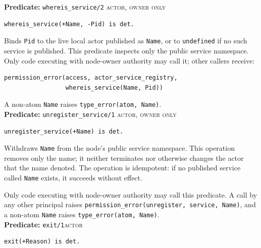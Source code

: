 \noindent \textbf{Predicate:} \texttt{whereis\_\allowbreak{}service/\allowbreak{}2}
\hfill\textsc{actor, owner only}

\begin{verbatim}
whereis_service(+Name, -Pid) is det.
\end{verbatim}

\noindent Binds \texttt{Pid} to the live local actor published as
\texttt{Name}, or to \texttt{undefined} if no such service is published.
This predicate inspects only the public service namespace. Only code executing
with node-owner authority may call it; other callers receive:
\begin{verbatim}
permission_error(access, actor_service_registry,
                 whereis_service(Name, Pid))
\end{verbatim}
A non-atom \texttt{Name} raises
\texttt{type\_\allowbreak{}error(\allowbreak{}atom,\allowbreak{}\,\allowbreak{}Name)}.\\

\noindent \textbf{Predicate:} \texttt{unregister\_\allowbreak{}service/\allowbreak{}1}
\hfill\textsc{actor, owner only}

\begin{verbatim}
unregister_service(+Name) is det.
\end{verbatim}

\noindent Withdraws \texttt{Name} from the node's public service namespace.
This operation removes only the name; it neither terminates nor otherwise
changes the actor that the name denoted. The operation is idempotent: if no
published service called \texttt{Name} exists, it succeeds without effect.

Only code executing with node-owner authority may call this predicate. A
call by any other principal raises
\texttt{permission\_\allowbreak{}error(\allowbreak{}unregister,\allowbreak{}\,\allowbreak{}service,\allowbreak{}\,\allowbreak{}Name)}, and a non-atom
\texttt{Name} raises \texttt{type\_\allowbreak{}error(\allowbreak{}atom,\allowbreak{}\,\allowbreak{}Name)}.\\


\noindent \textbf{Predicate:} \texttt{exit/\allowbreak{}1}\hfill\textsc{actor}

\begin{verbatim}
exit(+Reason) is det.
\end{verbatim}

